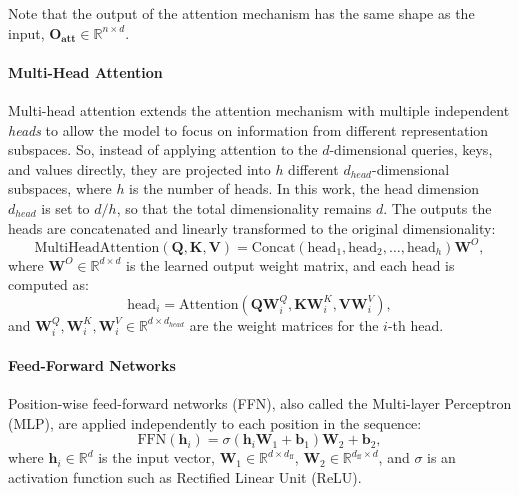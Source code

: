 Note that the output of the attention mechanism has the same shape as the input, $\mathbf{O_{att}} \in \mathbb{R}^{n \times d}$.

\paragraph{Multi-Head Attention}
Multi-head attention extends the attention mechanism with multiple independent \emph{heads} to allow the model to focus on information from different representation subspaces. So, instead of applying attention to the $d$-dimensional queries, keys, and values directly, they are projected into $h$ different $d_{head}$-dimensional subspaces, where $h$ is the number of heads. In this work, the head dimension $d_{head}$ is set to $d/h$, so that the total dimensionality remains $d$. The outputs the heads are concatenated and linearly transformed to the original dimensionality:
\begin{equation*}
    \text{MultiHeadAttention}(\mathbf{Q}, \mathbf{K}, \mathbf{V}) = \text{Concat}(\text{head}_1, \text{head}_2, \dots, \text{head}_h) \mathbf{W}^O,
\end{equation*}
where $\mathbf{W}^O \in \mathbb{R}^{d \times d}$ is the learned output weight matrix, and each head is computed as:
\begin{equation*}
    \text{head}_i = \text{Attention}(\mathbf{Q} \mathbf{W}_i^Q, \mathbf{K} \mathbf{W}_i^K, \mathbf{V} \mathbf{W}_i^V),
\end{equation*}
and $\mathbf{W}_i^Q, \mathbf{W}_i^K, \mathbf{W}_i^V \in \mathbb{R}^{d \times d_{head}}$ are the weight matrices for the $i$-th head.

\paragraph{Feed-Forward Networks}

Position-wise feed-forward networks (FFN), also called the Multi-layer Perceptron (MLP), are applied independently to each position in the sequence:
\begin{equation*}
    \text{FFN}(\mathbf{h}_i) = \sigma(\mathbf{h}_i \mathbf{W}_1 + \mathbf{b}_1) \mathbf{W}_2 + \mathbf{b}_2,
\end{equation*}
where $\mathbf{h}_i \in \mathbb{R}^d$ is the input vector, $\mathbf{W}_1 \in \mathbb{R}^{d \times d_{\text{ff}}}$, $\mathbf{W}_2 \in \mathbb{R}^{d_{\text{ff}} \times d}$, and $\sigma$ is an activation function such as Rectified Linear Unit (ReLU).

